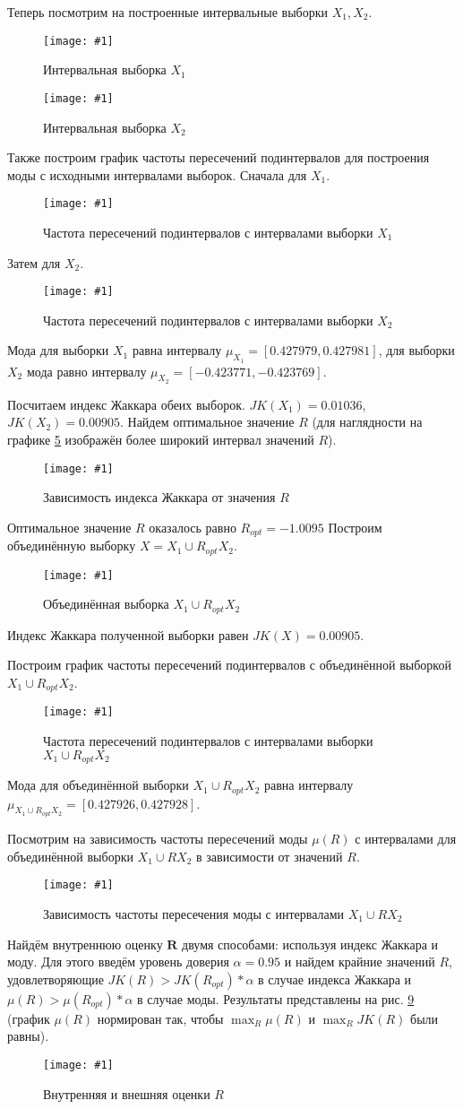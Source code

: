 \documentclass[a4paper,12pt]{article}
\newcommand{\plot}[3]{
    \begin{figure}[H]
        \begin{center}
            \texttt{[image: \#1]}
            \caption{#2}
            \label{#3}
        \end{center}
    \end{figure}
}
\begin{document}
    Теперь посмотрим на построенные интервальные выборки $ X_1, X_2 $.
    \plot{_X1}{Интервальная выборка $ X_1 $}{p:x1}
    \plot{_X2}{Интервальная выборка $ X_2 $}{p:x2}

    Также построим график частоты пересечений подинтервалов для построения моды с исходными интервалами выборок.
    Сначала для $ X_1 $.
    \plot{_ModaX1Hist}{Частота пересечений подинтервалов с интервалами выборки $ X_1 $}{p:modaX1}


    \newpage
    Затем для $ X_2 $.
    \plot{_ModaX2Hist}{Частота пересечений подинтервалов с интервалами выборки $ X_2 $}{p:modaX2}

    Мода для выборки $ X_1 $ равна интервалу $ \mu_{X_1} = [0.427979, 0.427981] $,
    для выборки $ X_2 $ мода равно интервалу $ \mu_{X_2} = [-0.423771, -0.423769] $.

    Посчитаем индекс Жаккара обеих выборок. $ JK(X_1) = 0.01036 $, $ JK(X_2) = 0.00905 $.
    Найдем оптимальное значение $ R $
    (для наглядности на графике \ref{p:jaccard} изображён более широкий интервал значений $ R $).
    \plot{_Jaccard}{Зависимость индекса Жаккара от значения $R$}{p:jaccard}

    Оптимальное значение $ R $ оказалось равно $ R_{opt} = -1.0095 $
    Построим объединённую выборку $ X = X_1 \cup R_{opt} X_2 $.
    \plot{_X1RX2}{Объединённая выборка $ X_1 \cup R_{opt} X_2 $}{p:x1rx2}

    Индекс Жаккара полученной выборки равен $ JK(X) = 0.00905 $.

    Построим график частоты пересечений подинтервалов с объединённой выборкой
    $ X_1 \cup R_{opt} X_2 $.
    \plot{_ModaX1RX2Hist}{Частота пересечений подинтервалов с интервалами выборки $ X_1 \cup R_{opt} X_2 $}{p:moadX2RX2}

    Мода для объединённой выборки $ X_1 \cup R_{opt} X_2 $ равна интервалу $ \mu_{X_1 \cup R_{opt} X_2} =  [0.427926, 0.427928] $.

    Посмотрим на зависимость частоты пересечений моды $ \mu(R) $ с интервалами
    для объединённой выборки $ X_1 \cup R X_2 $ в зависимости от значений $ R $.
    \plot{_ModaR}{Зависимость частоты пересечения моды с интервалами $ X_1 \cup R X_2 $}{p:modaR}

    Найдём внутреннюю оценку $ \textbf{R} $ двумя способами: используя индекс Жаккара и моду.
    Для этого введём уровень доверия $ \alpha = 0.95 $ и найдем крайние значений $ R $,
    удовлетворяющие $ JK(R) > JK(R_{opt}) * \alpha $ в случае индекса Жаккара
    и $ \mu(R) > \mu(R_{opt}) * \alpha $ в случае моды.
    Результаты представлены на рис. \ref{p:InnerOuter}
    (график $ \mu(R) $ нормирован так, чтобы $ \max_R{\mu(R)} $ и $ \max_R{JK(R)} $ были равны).
    \plot{_InnerOuter}{Внутренняя и внешняя оценки $ R $}{p:InnerOuter}
\end{document}
